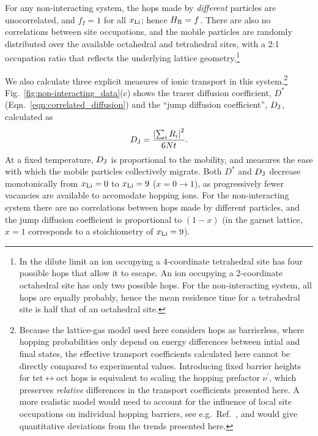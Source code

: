 \documentclass[aps,prb,twocolumn,superscriptaddress,reprint]{revtex4-1}
\newcommand{\xLi}{x_\m{Li}}
\begin{document}
For any non-interacting system, the hops made by \emph{different} particles are unocorrelated, and $f_I=1$ for all $\xLi$; hence $H_{\mathrm{R}}=f$. 
There are also no correlations between site occupations, and the mobile particles are randomly distributed over the available octahedral and tetrahedral sites, with a 2:1 occupation ratio that reflects the underlying lattice geometry.\footnote{In the dilute limit an ion occupying a 4-coordinate tetrahedral site has four possible hops that allow it to escape. An ion occupying a 2-coordinate octahedral site has only two possible hops. For the non-interacting system, all hops are equally probably, hence the mean residence time for a tetrahedral site is half that of an octahedral site.}

We also calculate three explicit measures of ionic transport in this system.\footnote{Because the lattice-gas model used here considers hops as barrierless, where hopping probabilities only depend on  energy differences between intial and final states, the effective transport coefficients calculated here cannot be directly compared to experimental values. 
Introducing fixed barrier heights for tet$\leftrightarrow$oct hops is equivalent to scaling the hopping prefactor $\nu^\prime$, which preserves \emph{relative} differences in the transport coefficients presented here. 
A more realistic model would need to account for the influence of local site occupations on individual hopping barriers, see e.g.\ Ref.~, and would give quantitative deviations from the trends presented here.} Fig.~\ref{fig:non-interacting_data}(c) shows the tracer diffusion coefficient, $D^*$ (Eqn.~\ref{eqn:correlated_diffusion}) and the ``jump diffusion coefficient'', $D_{\mathrm{J}}$,\cite{VanDerVenEtAl_AccChemRes2013} calculated as
\begin{equation}
  D_{\mathrm{J}}=\frac{\left|\sum_iR_i\right|^2}{6Nt}.
\end{equation}
At a fixed temperature, $D_{\mathrm{J}}$ is proportional to the mobility, and measures the ease with which the mobile particles collectively migrate. 
Both $D^*$ and $D_{\mathrm{J}}$ decrease monotonically from $\xLi=0$ to $\xLi=9$ ($x=0\to1$), as progressively fewer vacancies are available to accomodate hopping ions. 
For the non-interacting system there are no correlations between hops made by different particles, and the jump diffusion coefficient is proportional to $(1-x)$ (in the garnet lattice, $x=1$ corresponds to a stoichiometry of $\xLi=9$).\cite{Kutner_PhysLett1981,VanDerVenEtAl_AccChemRes2013}
\end{document}

